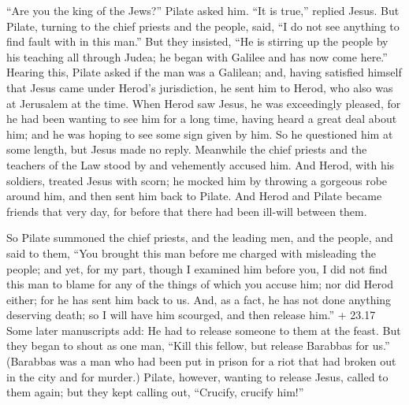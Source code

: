  ``Are you the king of the Jews?'' Pilate asked him. ``It is
true,'' replied Jesus.  But Pilate, turning to the chief
priests and the people, said, ``I do not see anything to find fault with
in this man.''  But they insisted, ``He is stirring up the
people by his teaching all through Judea; he began with Galilee and has
now come here.''  Hearing this, Pilate asked if the man was
a Galilean;  and, having satisfied himself that Jesus came
under Herod's jurisdiction, he sent him to Herod, who also was at
Jerusalem at the time.  When Herod saw Jesus, he was
exceedingly pleased, for he had been wanting to see him for a long time,
having heard a great deal about him; and he was hoping to see some sign
given by him.  So he questioned him at some length, but
Jesus made no reply.  Meanwhile the chief priests and the
teachers of the Law stood by and vehemently accused him. 
And Herod, with his soldiers, treated Jesus with scorn; he mocked him by
throwing a gorgeous robe around him, and then sent him back to Pilate.
 And Herod and Pilate became friends that very day, for
before that there had been ill-will between them.

 So Pilate summoned the chief priests, and the leading men,
and the people,  and said to them, ``You brought this man
before me charged with misleading the people; and yet, for my part,
though I examined him before you, I did not find this man to blame for
any of the things of which you accuse him;  nor did Herod
either; for he has sent him back to us. And, as a fact, he has not done
anything deserving death;  so I will have him scourged, and
then release him.''  + 23.17 Some later manuscripts add: He
had to release someone to them at the feast.  But they
began to shout as one man, ``Kill this fellow, but release Barabbas for
us.''  (Barabbas was a man who had been put in prison for a
riot that had broken out in the city and for murder.) 
Pilate, however, wanting to release Jesus, called to them again;
 but they kept calling out, ``Crucify, crucify him!''

